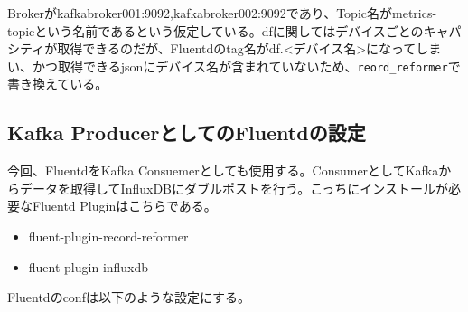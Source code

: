 Brokerがkafkabroker001:9092,kafkabroker002:9092であり、Topic名がmetrics-topicという名前であるという仮定している。dfに関してはデバイスごとのキャパシティが取得できるのだが、Fluentdのtag名がdf.<デバイス名>になってしまい、かつ取得できるjsonにデバイス名が含まれていないため、\verb|reord_reformer|で書き換えている。

\subsection{Kafka ProducerとしてのFluentdの設定}
今回、FluentdをKafka Consuemerとしても使用する。ConsumerとしてKafkaからデータを取得してInfluxDBにダブルポストを行う。こっちにインストールが必要なFluentd Pluginはこちらである。

\begin{itemize}
	\item fluent-plugin-record-reformer
	\item fluent-plugin-influxdb
\end{itemize}

Fluentdのconfは以下のような設定にする。

